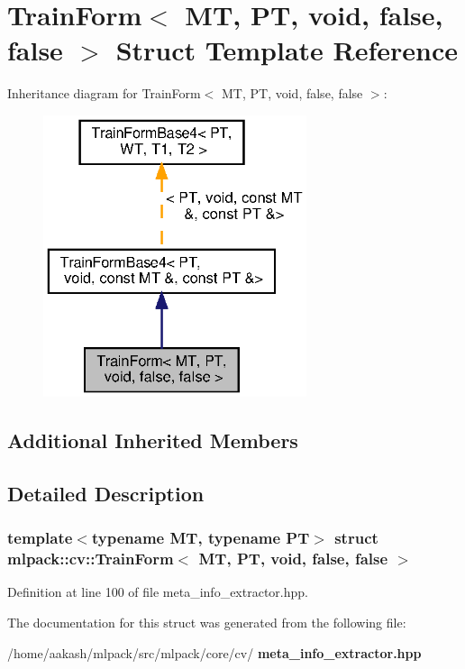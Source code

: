 \section{Train\+Form$<$ MT, PT, void, false, false $>$ Struct Template Reference}
\label{structmlpack_1_1cv_1_1TrainForm_3_01MT_00_01PT_00_01void_00_01false_00_01false_01_4}


Inheritance diagram for Train\+Form$<$ MT, PT, void, false, false $>$\+:
\nopagebreak
\begin{figure}[H]
\begin{center}
\leavevmode
\includegraphics[width=219pt]{structmlpack_1_1cv_1_1TrainForm_3_01MT_00_01PT_00_01void_00_01false_00_01false_01_4__inherit__graph}
\end{center}
\end{figure}
\subsection*{Additional Inherited Members}


\subsection{Detailed Description}
\subsubsection*{template$<$typename MT, typename PT$>$\newline
struct mlpack\+::cv\+::\+Train\+Form$<$ M\+T, P\+T, void, false, false $>$}



Definition at line 100 of file meta\+\_\+info\+\_\+extractor.\+hpp.



The documentation for this struct was generated from the following file\+:\begin{DoxyCompactItemize}
\item 
/home/aakash/mlpack/src/mlpack/core/cv/\textbf{ meta\+\_\+info\+\_\+extractor.\+hpp}\end{DoxyCompactItemize}
